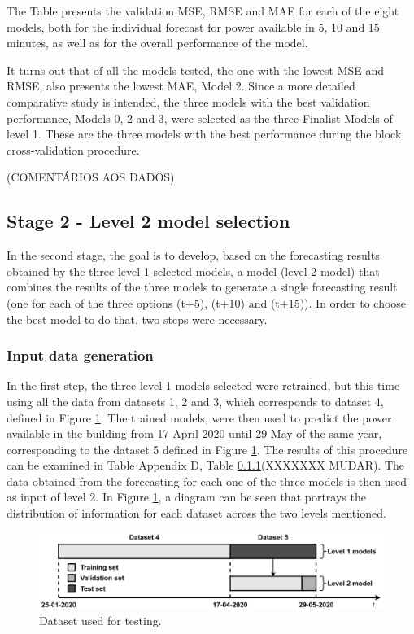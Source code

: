 The Table presents the validation \ac{MSE}, \ac{RMSE} and \ac{MAE} for each of the eight models, both for the individual forecast for power available in 5, 10 and 15 minutes, as well as for the overall performance of the model.


It turns out that of all the models tested, the one with the lowest \ac{MSE} and \ac{RMSE}, also presents the lowest \ac{MAE}, Model 2. Since a more detailed comparative study is intended, the three models with the best validation performance, Models 0, 2 and 3, were selected as the three Finalist Models of level 1. These are the three models with the best performance during the block cross-validation procedure. 


(COMENTÁRIOS AOS DADOS)



\subsection{Stage 2 - Level 2 model selection}

In the second stage, the goal is to develop, based on the forecasting results obtained by the three level 1 selected models, a model (level 2 model) that combines the results of the three models to generate a single forecasting result (one for each of the three options (t+5), (t+10) and (t+15)). In order to choose the best model to do that, two steps were necessary.

\subsubsection{Input data generation}

In the first step, the three level 1 models selected were retrained, but this time using all the data from datasets 1, 2 and 3, which corresponds to dataset 4, defined in Figure \ref{level22}. The trained models, were then used to predict the power available in the building from 17 April 2020 until 29 May of the same year, corresponding to the dataset 5 defined in Figure \ref{level22}. The results of this procedure can be examined in Table Appendix D, Table \ref{}(XXXXXXX MUDAR). The data obtained from the forecasting for each one of the three models is then used as input of level 2. In Figure \ref{level22}, a diagram can be seen that portrays the distribution of information for each dataset across the two levels mentioned.

\begin{figure}[h!]
    \centering
    \begin{center}
    \includegraphics[width=1\textwidth]{Images/stage2.png}
    \caption{Dataset used for testing.}
    \label{level22}
    \end{center}
\end{figure}

